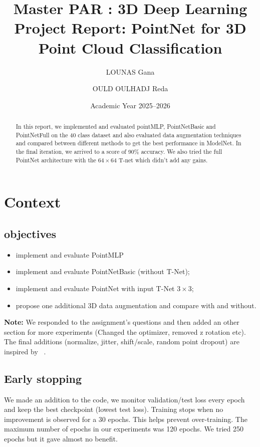\documentclass[11pt,a4paper]{article}
\title{Master PAR : 3D Deep Learning\\Project Report: PointNet for 3D Point Cloud Classification}
\author{LOUNAS Gana \and OULD OULHADJ Reda}
\date{Academic Year 2025--2026}
\begin{document}
\maketitle

\begin{abstract}
  In this report, we implemented and evaluated pointMLP, PointNetBasic and PointNetFull on the 40 class dataset and also evaluated data augmentation techniques and compared between different methods to get the best performance in ModelNet. In the final iteration, we arrived to a score of 90\% accuracy. We also tried the full PointNet architecture with the $64\times64$ T-net which didn't add any gains.


\end{abstract}

\section{Context}
\subsection{objectives}

\begin{itemize}[leftmargin=*]
  \item implement and evaluate PointMLP
  \item implement and evaluate PointNetBasic (without T-Net);
  \item implement and evaluate PointNet with input T-Net $3\times3$;
  \item propose one additional 3D data augmentation and compare with and without.
\end{itemize}

\textbf{Note: } We responded to the assignment's questions and then added an other section for more experiments (Changed the optimizer, removed z rotation etc). The final additions (normalize, jitter, shift/scale, random point dropout) are inspired by ~\cite{pointnet_pytorch}.

\subsection{Early stopping}
We made an addition to the code, we monitor validation/test loss every epoch and keep the best checkpoint (lowest test loss). Training stops when no improvement is observed for a 30 epochs. This helps prevent over-training. The maximum number of epochs in our experiments was 120 epochs. We tried 250 epochs but it gave almost no benefit.
\end{document}
